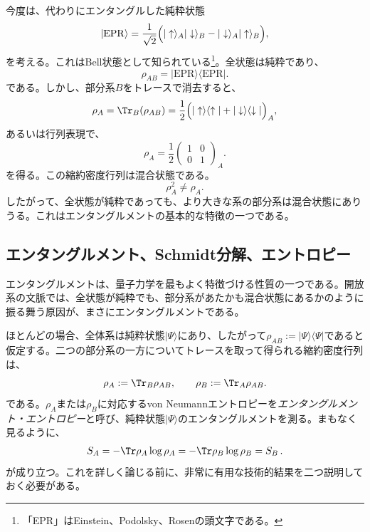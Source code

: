 \documentclass[a4paper,11pt,oneside]{article}
\theoremstyle{definition}
\numberwithin{equation}{section}
\begin{document}
今度は、代わりにエンタングルした純粋状態
\begin{equation}
|\mathrm{EPR}\rangle
=
\frac{1}{\sqrt{2}}
\Bigl(
|\uparrow\rangle_A |\downarrow\rangle_B
-
|\downarrow\rangle_A |\uparrow\rangle_B
\Bigr) ,
\end{equation}
を考える。これはBell状態として知られている\footnote{「EPR」はEinstein、Podolsky、Rosenの頭文字である。}。全状態は純粋であり、
\begin{equation}
\rho_{AB}=|\mathrm{EPR}\rangle\langle \mathrm{EPR}| .
\end{equation}
である。しかし、部分系$B$をトレースで消去すると、
\begin{equation}
\rho_A
=
\Tr_B(\rho_{AB})
=
\frac12
\Bigl(
|\uparrow\rangle\langle\uparrow|
+
|\downarrow\rangle\langle\downarrow|
\Bigr)_A ,
\end{equation}
あるいは行列表現で、
\begin{equation}
\rho_A
=
\frac12
\begin{pmatrix}
1 & 0 \\
0 & 1
\end{pmatrix}_A .
\end{equation}
を得る。この縮約密度行列は混合状態である。
\begin{equation}
\rho_A^2 \neq \rho_A .
\end{equation}
したがって、全状態が純粋であっても、より大きな系の部分系は混合状態にありうる。これはエンタングルメントの基本的な特徴の一つである。





\subsection{エンタングルメント、Schmidt分解、エントロピー}



エンタングルメントは、量子力学を最もよく特徴づける性質の一つである。開放系の文脈では、全状態が純粋でも、部分系があたかも混合状態にあるかのように振る舞う原因が、まさにエンタングルメントである。



ほとんどの場合、全体系は純粋状態$|\Psi\rangle$にあり、したがって$ \rho_{AB} := |\Psi\rangle\langle\Psi|   $であると仮定する。二つの部分系の一方についてトレースを取って得られる縮約密度行列は、
\begin{equation}
\rho_A := \Tr_B \rho_{AB},
\qquad
\rho_B := \Tr_A \rho_{AB} .
\end{equation}
である。$\rho_A$または$\rho_B$に対応するvon Neumannエントロピーを\textit{エンタングルメント・エントロピー}と呼び、純粋状態$|\Psi\rangle$のエンタングルメントを測る。まもなく見るように、
\begin{align}
S_{A}=-\Tr \rho_{A} \log \rho_{A}=-\Tr \rho_{B} \log \rho_{B}=S_{B}\,.
\end{align}
が成り立つ。これを詳しく論じる前に、非常に有用な技術的結果を二つ説明しておく必要がある。
\end{document}
